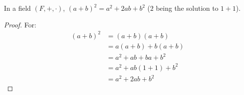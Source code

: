    \begin{theorem}
        In a field $(F,+,\cdot)$, $(a+b)^{2}=a^{2}+2ab+b^{2}$
        ($2$ being the solution to $1+1$).
    \end{theorem}
    \begin{proof}
        For:
        \begin{align}
            (a+b)^{2}&=(a+b)(a+b)\\
                     &=a(a+b)+b(a+b)\\
                     &=a^{2}+ab+ba+b^{2}\\
                     &=a^{2}+ab(1+1)+b^{2}\\
                     &=a^{2}+2ab+b^{2}
        \end{align}
    \end{proof}